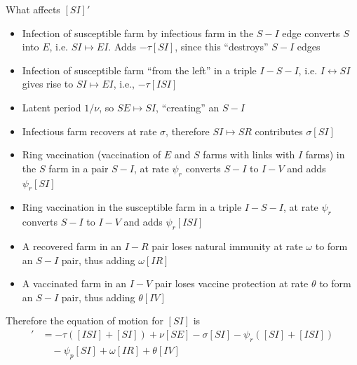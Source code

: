 \documentclass[aspectratio=43]{beamer}
\begin{document}
\begin{frame}{What affects $[SI]'$}
	\begin{itemize}
		\item Infection of susceptible farm by infectious farm in the
		$S-I$ edge converts $S$ into $E$, i.e. $SI\mapsto EI$. Adds $-\tau[SI]$, since this ``destroys'' $S-I$ edges
		\item Infection of susceptible farm ``from the left'' in a triple $I-S-I$,
		i.e. $I\leftrightarrow SI$ gives rise to $SI\mapsto EI$, i.e., $-\tau[ISI]$
		\item Latent period $1/\nu$, so $SE\mapsto SI$, ``creating'' an $S-I$
		\item Infectious farm recovers at rate $\sigma$, therefore $SI\mapsto SR$ contributes $\sigma[SI]$ 
		\item Ring vaccination (vaccination of $E$ and $S$ farms with links with $I$ farms) in the $S$ farm in a pair $S-I$, at rate $\psi_r$ converts $S-I$ to $I-V$ and adds $\psi_r[SI]$
		\item Ring vaccination in the susceptible farm in a triple $I-S-I$, at rate
		$\psi_r$ converts $S-I$ to $I-V$ and adds $\psi_r[ISI]$
		\item A recovered farm in an $I-R$ pair loses natural immunity at rate
		$\omega$ to form an $S-I$ pair, thus adding $\omega[IR]$
		\item A vaccinated farm in an $I-V$ pair loses vaccine protection at rate $\theta$ to form an $S-I$ pair, thus adding $\theta[IV]$
	\end{itemize}
\end{frame}

\begin{frame}
Therefore the equation of motion for $[SI]$ is
\begin{align*}
	[SI]' &= -\tau([ISI]+[SI])+\nu[SE]-\sigma[SI]-\psi_r([SI]+[ISI])\\
	&\quad -\psi_p[SI]+\omega[IR]+\theta[IV]
\end{align*}
\end{frame}

\end{document}
